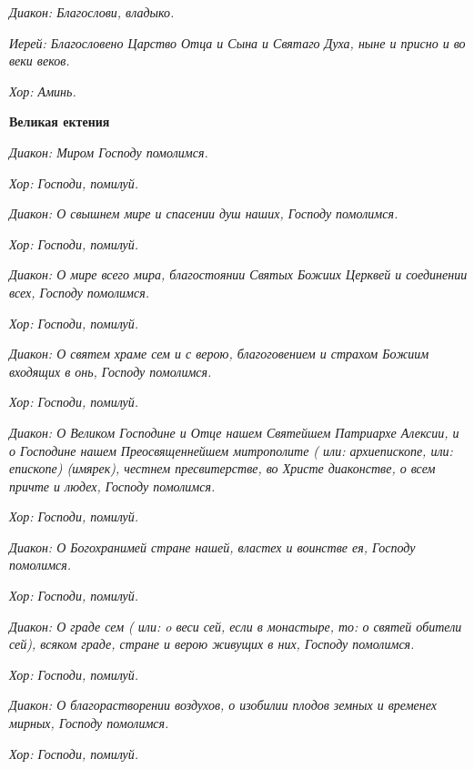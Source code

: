 \itshape Диакон:\normalfont{} Благослови, владыко.


\itshape Иерей:\normalfont{} Благословено Царство Отца и Сына и Святаго Духа, ныне и присно и во веки веков.


\itshape Хор:\normalfont{} Аминь.





\bfseries Великая ектения\normalfont{}


\itshape Диакон:\normalfont{} Миром Господу помолимся.


\itshape Хор:\normalfont{} Господи, помилуй.


\itshape Диакон:\normalfont{} О свышнем мире и спасении душ наших, Господу помолимся.


\itshape Хор:\normalfont{} Господи, помилуй.


\itshape Диакон:\normalfont{} О мире всего мира, благостоянии Святых Божиих Церквей и соединении всех, Господу помолимся.


\itshape Хор:\normalfont{} Господи, помилуй.


\itshape Диакон:\normalfont{} О святем храме сем и с верою, благоговением и страхом Божиим входящих в онь, Господу помолимся.


\itshape Хор:\normalfont{} Господи, помилуй.


\itshape Диакон:\normalfont{} О Великом Господине и Отце нашем Святейшем Патриархе Алексии, и о Господине нашем Преосвященнейшем митрополите ( \itshape или:\normalfont{} архиепископе, \itshape или:\normalfont{} епископе) \itshape (имярек)\normalfont{}, честнем пресвитерстве, во Христе диаконстве, о всем причте и людех, Господу помолимся.


\itshape Хор:\normalfont{} Господи, помилуй.


\itshape Диакон:\normalfont{} О Богохранимей стране нашей, властех и воинстве ея, Господу помолимся.


\itshape Хор:\normalfont{} Господи, помилуй.


\itshape Диакон:\normalfont{} О граде сем ( \itshape или:\normalfont{} o веси сей, \itshape если в монастыре, то:\normalfont{} о святей обители сей), всяком граде, стране и верою живущих в них, Господу помолимся.


\itshape Хор:\normalfont{} Господи, помилуй.


\itshape Диакон:\normalfont{} О благорастворении воздухов, о изобилии плодов земных и временех мирных, Господу помолимся.


\itshape Хор:\normalfont{} Господи, помилуй.


